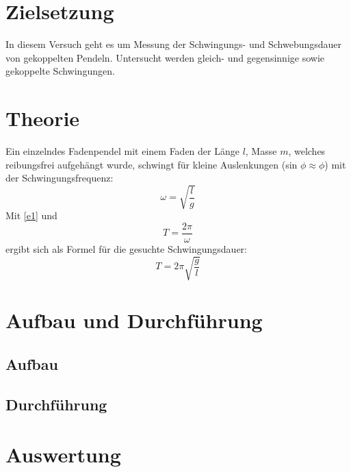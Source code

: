 \maketitle
\tableofcontents
\newpage

\section{Zielsetzung}
In diesem Versuch geht es um Messung der Schwingungs- und Schwebungsdauer von gekoppelten Pendeln.
Untersucht werden gleich- und gegensinnige sowie gekoppelte Schwingungen.
\section{Theorie}
Ein einzelndes Fadenpendel mit einem Faden der Länge $\textit{l}$, Masse $\textit{m}$, welches reibungsfrei aufgehängt wurde,
schwingt für kleine Auslenkungen (sin $\phi \approx \phi$) mit der Schwingungsfrequenz:
\begin{equation}
  \omega = \sqrt{\frac{\textit{l}}{g}}
  \label{e1}
\end{equation}
Mit \eqref{e1} und
\begin{equation*}
  \textit{T} = \frac{2\pi}{\omega}
\end{equation*}
ergibt sich als Formel für die gesuchte Schwingungsdauer:
\begin{equation}
  \textit{T} = 2\pi \sqrt{\frac{g}{\textit{l}}}
\end{equation}
\section{Aufbau und Durchführung}
  \subsection{Aufbau}
  \subsection{Durchführung}
\newpage

\section{Auswertung}

\newpage
\nocite{*}
\printbibliography

